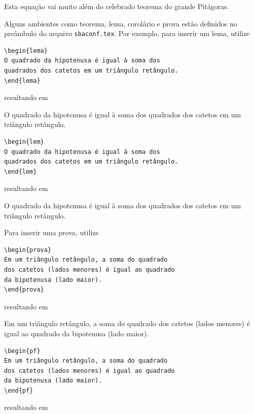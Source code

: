 Esta equação vai muito além do celebrado teorema do grande Pitágoras.

Alguns ambientes como teorema, lema, corolário e prova estão definidos no preâmbulo 
do arquivo {\tt sbaconf.tex}. Por exemplo, para inserir um lema, utilize
\if{}
\begin{verbatim}
\begin{lema}
O quadrado da hipotenusa é igual à soma dos 
quadrados dos catetos em um triângulo retângulo.
\end{lema}
\end{verbatim}
resultando em
\begin{lema}   %
	O quadrado da hipotenusa é igual à soma dos quadrados dos catetos em um triângulo retângulo. 
\end{lema}
\else
\begin{verbatim}
\begin{lem}
O quadrado da hipotenusa é igual à soma dos 
quadrados dos catetos em um triângulo retângulo.
\end{lem}
\end{verbatim}
resultando em
\begin{lem}   %
	O quadrado da hipotenusa é igual à soma dos quadrados dos catetos em um triângulo retângulo. 
\end{lem}
\fi

Para inserir uma prova, utilize
\if{}
\begin{verbatim}
\begin{prova}
Em um triângulo retângulo, a soma do quadrado 
dos catetos (lados menores) é igual ao quadrado 
da bipotenusa (lado maior). 
\end{prova}
\end{verbatim}
resultando em

\begin{prova}    %
Em um triângulo retângulo, a soma do quadrado dos catetos (lados menores) é igual ao quadrado da bipotenusa (lado maior). 
\end{prova}
\else
\begin{verbatim}
\begin{pf}
Em um triângulo retângulo, a soma do quadrado 
dos catetos (lados menores) é igual ao quadrado 
da bipotenusa (lado maior). 
\end{pf}
\end{verbatim}
resultando em

